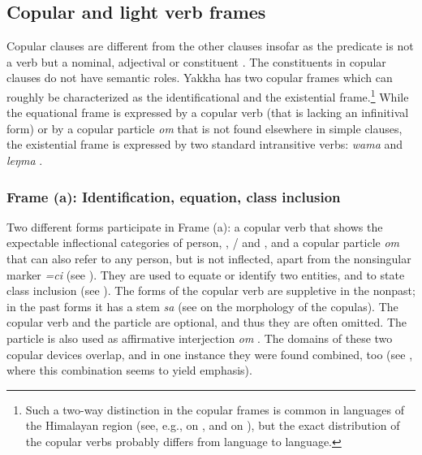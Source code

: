 \subsection[Copular and light verb frames]{Copular and light verb frames}\label{cop}

Copular clauses are different from the other clauses insofar as the predicate is not a verb but a nominal, adjectival or  constituent \citep[225]{Dryer2007Clause}. The constituents in copular clauses do not have semantic roles. Yakkha has two copular frames which can roughly be characterized as the identificational and the existential frame.\footnote{Such a two-way distinction in the copular frames is common in languages of the Himalayan region (see, e.g., \citealt{Genetti2007_Newari} on , and \citealt{Matthews1984Course} on ), but the exact distribution of the copular verbs probably differs from language to language.} While the equational frame is expressed by a copular verb (that is lacking an infinitival form) or by a copular particle \emph{om} that is not found elsewhere in simple clauses, the existential frame is expressed by two standard intransitive verbs: \emph{wama}  and \emph{leŋma} . 

\subsubsection{Frame (a): Identification, equation,  class inclusion}

Two different forms participate in Frame (a): a copular verb that shows the expectable inflectional categories of person, , / and , and a copular particle \emph{om} that can also refer to any person, but is not inflected, apart from the nonsingular marker \emph{=ci} (see \Next[c]). They are used to equate or identify two entities, and to state class inclusion (see \Next).  The forms of the copular verb are suppletive in the nonpast; in the past forms it has a stem \emph{sa} (see  on the morphology of the copulas). The copular verb and the particle are optional, and thus they are often omitted. The particle is also used as affirmative interjection \emph{om} .  The domains of these two copular devices overlap, and in one instance they were found combined, too (see \Next[d], where this combination seems to yield emphasis).
 
